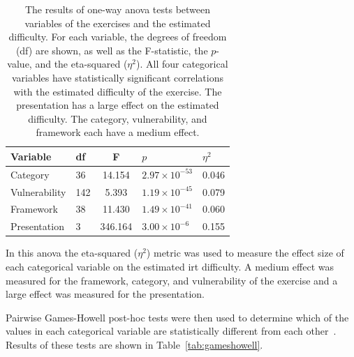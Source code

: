 \begin{table}
    \centering
    \caption[\Gls{anova} test results for Rasch model]{The results of one-way \gls{anova} tests between variables of the exercises and the estimated difficulty. For each variable, the degrees of freedom (df) are shown, as well as the F-statistic, the $p$-value, and the eta-squared ($\eta^2$). All four categorical variables have statistically significant correlations with the estimated difficulty of the exercise. The presentation has a large effect on the estimated difficulty. The category, vulnerability, and framework each have a medium effect.}
    \setcellgapes{4pt}\makegapedcells
    \begin{tabular}{l l S[table-format=3.3] l l}
Variable & df & F & $p$ & $\eta^2$ \\
    \hline
    Category & 36 & 14.154 & $2.97 \times 10^{-53}$ & 0.046 \\
    Vulnerability & 142 & 5.393 & $1.19 \times 10^{-45}$ & 0.079 \\
    Framework & 38 & 11.430 & $ 1.49 \times 10^{-41}$ & 0.060 \\
    Presentation & 3 & 346.164 & $3.00 \times 10^{-6}$ & 0.155 \\
    \end{tabular}
    \label{tab:anova1}
\end{table}

In this \gls{anova} the eta-squared ($\eta^2$) metric was used to measure the effect size of each categorical variable on the estimated \gls{irt} difficulty.
A medium effect was measured for the framework, category, and vulnerability of the exercise and a large effect was measured for the presentation.

Pairwise Games-Howell post-hoc tests were then used to determine which of the values in each categorical variable are statistically different from each other~\cite{games1976pairwise}.
Results of these tests are shown in Table~\ref{tab:gameshowell}.

